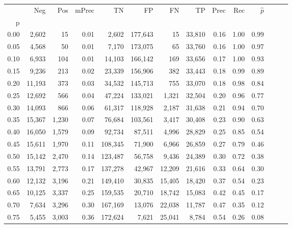 \begin{tabular}{rrrrrrrrrrrrrr}
\toprule
{} &     Neg &    Pos & mPrec &       TN &       FP &      FN &      TP &  Prec &   Rec & $\hat{p}$ \\
p    &         &        &       &          &          &         &         &       &       &           \\
\midrule
0.00 &   2,602 &     15 &  0.01 &    2,602 &  177,643 &      15 &  33,810 &  0.16 &  1.00 &      0.99 \\
0.05 &   4,568 &     50 &  0.01 &    7,170 &  173,075 &      65 &  33,760 &  0.16 &  1.00 &      0.97 \\
0.10 &   6,933 &    104 &  0.01 &   14,103 &  166,142 &     169 &  33,656 &  0.17 &  1.00 &      0.93 \\
0.15 &   9,236 &    213 &  0.02 &   23,339 &  156,906 &     382 &  33,443 &  0.18 &  0.99 &      0.89 \\
0.20 &  11,193 &    373 &  0.03 &   34,532 &  145,713 &     755 &  33,070 &  0.18 &  0.98 &      0.84 \\
0.25 &  12,692 &    566 &  0.04 &   47,224 &  133,021 &   1,321 &  32,504 &  0.20 &  0.96 &      0.77 \\
0.30 &  14,093 &    866 &  0.06 &   61,317 &  118,928 &   2,187 &  31,638 &  0.21 &  0.94 &      0.70 \\
0.35 &  15,367 &  1,230 &  0.07 &   76,684 &  103,561 &   3,417 &  30,408 &  0.23 &  0.90 &      0.63 \\
0.40 &  16,050 &  1,579 &  0.09 &   92,734 &   87,511 &   4,996 &  28,829 &  0.25 &  0.85 &      0.54 \\
0.45 &  15,611 &  1,970 &  0.11 &  108,345 &   71,900 &   6,966 &  26,859 &  0.27 &  0.79 &      0.46 \\
0.50 &  15,142 &  2,470 &  0.14 &  123,487 &   56,758 &   9,436 &  24,389 &  0.30 &  0.72 &      0.38 \\
0.55 &  13,791 &  2,773 &  0.17 &  137,278 &   42,967 &  12,209 &  21,616 &  0.33 &  0.64 &      0.30 \\
0.60 &  12,132 &  3,196 &  0.21 &  149,410 &   30,835 &  15,405 &  18,420 &  0.37 &  0.54 &      0.23 \\
0.65 &  10,125 &  3,337 &  0.25 &  159,535 &   20,710 &  18,742 &  15,083 &  0.42 &  0.45 &      0.17 \\
0.70 &   7,634 &  3,296 &  0.30 &  167,169 &   13,076 &  22,038 &  11,787 &  0.47 &  0.35 &      0.12 \\
0.75 &   5,455 &  3,003 &  0.36 &  172,624 &    7,621 &  25,041 &   8,784 &  0.54 &  0.26 &      0.08 \\

\end{tabular}
